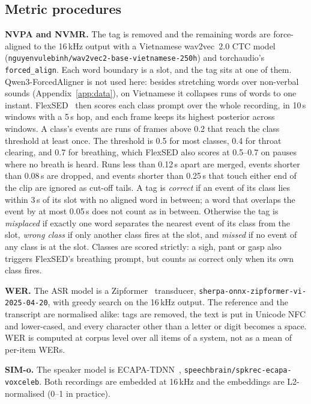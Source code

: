 \documentclass{article} %
\begin{document}
\subsection{Metric procedures}\label{app:metrics}
\textbf{NVPA and NVMR.} The tag is removed and the remaining words are force-aligned to the
16\,kHz output with a Vietnamese wav2vec~2.0 CTC model~\citep{wav2vec2}
(\nolinkurl{nguyenvulebinh/wav2vec2-base-vietnamese-250h}) and torchaudio's
\texttt{forced\_align}. Each word boundary is a slot, and the tag sits at one of them.
Qwen3-ForcedAligner is not used here: besides stretching words over non-verbal sounds
(Appendix~\ref{app:data}), on Vietnamese it collapses runs of words to one instant.
FlexSED~\citep{flexsed} then
scores each class prompt over the whole recording, in 10\,s windows with a 5\,s hop, and each
frame keeps its highest posterior across windows. A class's events are runs of frames above 0.2
that reach the class threshold at least once. The threshold is 0.5 for most classes, 0.4 for
throat clearing, and 0.7 for breathing, which FlexSED also scores at 0.5--0.7 on pauses where no
breath is heard. Runs less than 0.12\,s apart are merged, events shorter than 0.08\,s are
dropped, and events shorter than 0.25\,s that touch either end of the clip are ignored as
cut-off tails. A tag is \emph{correct} if an event of its class lies within 3\,s of its slot
with no aligned word in between; a word that overlaps the event by at most 0.05\,s does not
count as in between. Otherwise the tag is \emph{misplaced} if exactly one word separates the
nearest event of its class from the slot, \emph{wrong class} if only another class fires at the
slot, and \emph{missed} if no event of any class is at the slot. Classes are scored strictly: a
sigh, pant or gasp also triggers FlexSED's breathing prompt, but counts as correct only when its
own class fires.

\textbf{WER.} The ASR model is a Zipformer~\citep{zipformer} transducer,
\nolinkurl{sherpa-onnx-zipformer-vi-2025-04-20}, with greedy
search on the 16\,kHz output. The reference and the transcript are normalised alike: tags are
removed, the text is put in Unicode NFC and lower-cased, and every character other than a
letter or digit becomes a space. WER is computed at corpus level over all items of a system,
not as a mean of per-item WERs.

\textbf{SIM-o.} The speaker model is ECAPA-TDNN~\citep{ecapa},
\nolinkurl{speechbrain/spkrec-ecapa-voxceleb}. Both
recordings are embedded at 16\,kHz and the embeddings are L2-normalised (0--1 in practice).
\end{document}
